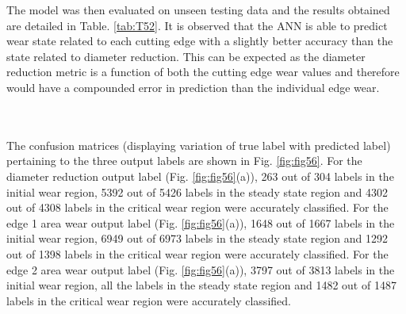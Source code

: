 \documentclass[preprint,review,12pt]{elsarticle}
\begin{document}
The model was then evaluated on unseen testing data and the results obtained are detailed in Table. \ref{tab:T52}. It is observed that the ANN is able to predict wear state related to each cutting edge with a slightly better accuracy than the state related to diameter reduction. This can be expected as the diameter reduction metric is a function of both the cutting edge wear values and therefore would have a compounded error in prediction than the individual edge wear. \par

\begin{minipage}{\linewidth}
   \label{tab:T52}
  \centering
\end{minipage} \\\\

The confusion matrices (displaying variation of true label with predicted label) pertaining to the three output labels are shown in Fig. \ref{fig:fig56}. For the diameter reduction output label (Fig. \ref{fig:fig56}(a)), 263 out of 304 labels in the initial wear region, 5392 out of 5426 labels in the steady state region and 4302 out of 4308 labels in the critical wear region were accurately classified. For the edge 1 area wear output label (Fig. \ref{fig:fig56}(a)), 1648 out of 1667 labels in the initial wear region, 6949 out of 6973 labels in the steady state region and 1292 out of 1398 labels in the critical wear region were accurately classified. For the edge 2 area wear output label (Fig. \ref{fig:fig56}(a)), 3797 out of 3813 labels in the initial wear region, all the labels in the steady state region and 1482 out of 1487 labels in the critical wear region were accurately classified. \par
\end{document}
